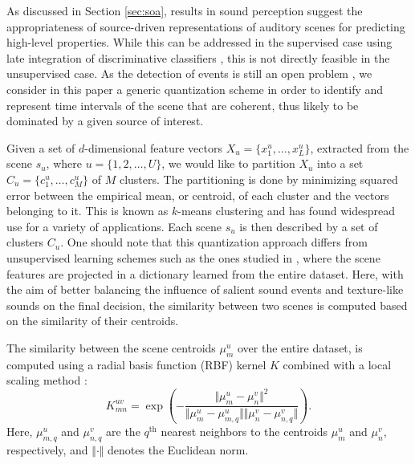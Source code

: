\documentclass[smallextended]{svjour3}
\begin{document}
As discussed in Section \ref{sec:soa}, results in sound perception suggest the appropriateness of source-driven representations of auditory scenes for predicting high-level properties. While this can be addressed in the supervised case using late integration of discriminative classifiers \cite{Anden2014}, this is not directly feasible in the unsupervised case. As the detection of events is still an open problem \cite{7100934}, we consider in this paper a generic quantization scheme in order to identify and represent time intervals of the scene that are coherent, thus likely to be dominated by a given source of interest.

Given a set of $d$-dimensional feature vectors $X_u = \{x_1^u, \ldots, x_L^u\}$, extracted from the scene $s_u$, where $u=\lbrace 1,2,\ldots,U\rbrace$, we would like to partition $X_u$ into a set $C_u = \{c^u_1, \ldots, c^u_M\}$ of $M$ clusters. The partitioning is done by minimizing squared error between the empirical mean, or centroid, of each cluster and the vectors belonging to it. This is known as $k$-means clustering \cite{lloyd} and has found widespread use for a variety of applications.
Each scene $s_u$ is then described by a set of clusters $C_u$. One should note that this quantization approach differs from unsupervised learning schemes such as the ones studied in \cite{bisot2016acoustic}, where the scene features are projected in a dictionary learned from the entire dataset. Here, with the aim of better balancing the influence of salient sound events and texture-like sounds on the final decision, the similarity between two scenes is computed based on the similarity of their centroids.

The similarity between the scene centroids $\mu_m^u$ over the entire dataset, is computed using a radial basis function (RBF) kernel $K$ combined with a local scaling method \cite{selfTuneManor2004}:
\begin{equation}
\label{eq:kc}
K_{mn}^{uv} = \exp\left( - \dfrac{\Vert \mu_m^u - \mu_n^v \Vert^2}{\Vert \mu_m^u - \mu_{m,q}^u \Vert \Vert \mu_n^v - \mu_{n,q}^v \Vert} \right).
\end{equation}
Here, $\mu_{m,q}^u$ and $\mu_{n,q}^v$ are the $q^{\textrm{th}}$ nearest neighbors to the centroids $\mu_m^u$ and $\mu_n^v$, respectively, and $\Vert \cdot \Vert$ denotes the Euclidean norm.
\end{document}
